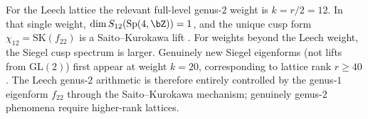 \begin{remark}%
\label{rem:leech-weight12-sk}%
%
%
For the Leech lattice the relevant full-level genus-$2$ weight is
$k = r/2 = 12$. In that single weight,
$\dim S_{12}(\mathrm{Sp}(4,\bZ)) = 1$, and the unique
cusp form $\chi_{12} = \mathrm{SK}(f_{22})$ is a
Saito--Kurokawa lift
\cite{DPSS20,PiatetskiShapiro1983,Schmidt2007}.
For weights beyond the Leech weight, the Siegel cusp spectrum is
larger.
Genuinely new Siegel eigenforms \textup{(}not
lifts from $\mathrm{GL}(2)$\textup{)} first appear
at weight $k = 20$, corresponding to lattice
rank $r \geq 40$.
The Leech genus-$2$ arithmetic is therefore entirely
controlled by the genus-$1$ eigenform $f_{22}$
through the Saito--Kurokawa mechanism;
genuinely genus-$2$ phenomena require higher-rank
lattices.
\end{remark}

